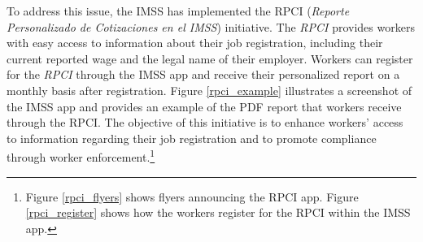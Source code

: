 \documentclass[oneside,11pt]{article}
\begin{document}
To address this issue, the IMSS has implemented the RPCI (\textit{Reporte Personalizado de Cotizaciones en el IMSS}) initiative. The \textit{RPCI} provides workers with easy access to information about their job registration, including their current reported wage and the legal name of their employer. Workers can register for the \textit{RPCI} through the IMSS app and receive their personalized report on a monthly basis after registration. Figure \ref{rpci_example} illustrates a screenshot of the IMSS app and provides an example of the PDF report that workers receive through the RPCI. The objective of this initiative is to enhance workers' access to information regarding their job registration and to promote compliance through worker enforcement.\footnote{Figure \ref{rpci_flyers} shows flyers announcing the RPCI app. Figure \ref{rpci_register} shows how the workers register for the RPCI within the IMSS app.}





\end{document}
